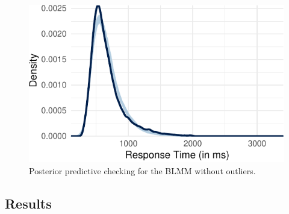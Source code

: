 \documentclass[
  11pt,
  english,
  ,doc,floatsintext]{apa6}
\begin{document}
\begin{figure}[htb]

{\centering \includegraphics[width=\textwidth]{supplementary_materials_files/figure-latex/ppcheckBMwo-1} 

}

\caption{Posterior predictive checking for the BLMM without outliers.}\label{fig:ppcheckBMwo}
\end{figure}

\newpage

\hypertarget{results}{%
\subsection{Results}\label{results}}
\end{document}
